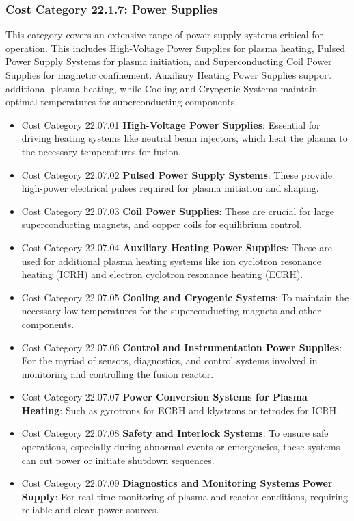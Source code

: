 \subsubsection*{Cost Category 22.1.7: Power Supplies} 

This category covers an extensive range of power supply systems critical for operation. This includes High-Voltage Power Supplies for plasma heating, Pulsed Power Supply Systems for plasma initiation, and Superconducting Coil Power Supplies for magnetic confinement. Auxiliary Heating Power Supplies support additional plasma heating, while Cooling and Cryogenic Systems maintain optimal temperatures for superconducting components. 


\begin{itemize}
    \item Cost Category 22.07.01 \textbf{High-Voltage Power Supplies}: Essential for driving heating systems like neutral beam injectors, which heat the plasma to the necessary temperatures for fusion.
    \item Cost Category 22.07.02 \textbf{Pulsed Power Supply Systems}: These provide high-power electrical pulses required for plasma initiation and shaping.
    \item Cost Category 22.07.03 \textbf{Coil Power Supplies}: These are crucial for large superconducting magnets, and copper coils for equilibrium control.
    \item Cost Category 22.07.04 \textbf{Auxiliary Heating Power Supplies}: These are used for additional plasma heating systems like ion cyclotron resonance heating (ICRH) and electron cyclotron resonance heating (ECRH).
    \item Cost Category 22.07.05 \textbf{Cooling and Cryogenic Systems}: To maintain the necessary low temperatures for the superconducting magnets and other components.
    \item Cost Category 22.07.06 \textbf{Control and Instrumentation Power Supplies}: For the myriad of sensors, diagnostics, and control systems involved in monitoring and controlling the fusion reactor.
    \item Cost Category 22.07.07 \textbf{Power Conversion Systems for Plasma Heating}: Such as gyrotrons for ECRH and klystrons or tetrodes for ICRH.
    \item Cost Category 22.07.08 \textbf{Safety and Interlock Systems}: To ensure safe operations, especially during abnormal events or emergencies, these systems can cut power or initiate shutdown sequences.
    \item Cost Category  22.07.09 \textbf{Diagnostics and Monitoring Systems Power Supply}: For real-time monitoring of plasma and reactor conditions, requiring reliable and clean power sources.
\end{itemize}

